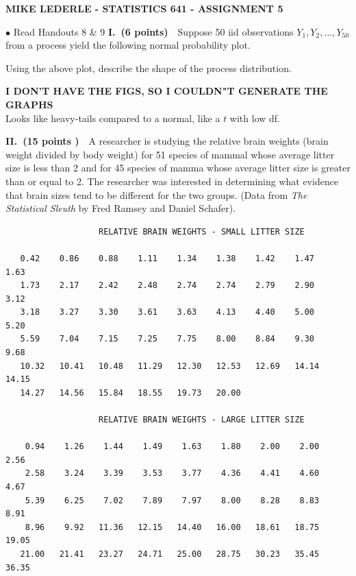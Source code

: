 \documentclass{article}\usepackage{graphicx, color}
\def\vvn{\vskip0mm\noindent}
\def\vnn{\vskip0mm\noindent}
\begin{document}
\begin{center}
{\bf MIKE LEDERLE - STATISTICS 641 - ASSIGNMENT 5}
\end{center}
\vskip0mm\noindent
\normalsize
\vnn\vnn
$\bullet$ Read Handouts 8 \& 9
\vnn\vnn
{\bf I.\ (6 points)}\ \   Suppose 50  iid
  observations $Y_1,Y_2,\ldots,Y_{50}$ from a process yield the following normal
  probability plot.


Using the above plot, describe the shape of the process distribution.
\vskip3mm
\vvn
\begin{shaded}
{\bf I DON'T HAVE THE FIGS, SO I COULDN"T GENERATE THE GRAPHS}\\[5pt]
Looks like heavy-tails compared to a normal, like a $t$ with low df.
\end{shaded}
{\bf II.\ (15 points )}\ \  A researcher is studying the relative brain weights (brain weight divided by body weight) for 51 species of mammal whose average litter size is less than 2 and for 45 species of mamma whose average litter size is greater than or equal to 2. The researcher was interested in determining what evidence that brain sizes tend to be different for
    the two groups. (Data from {\it The Statistical Sleuth} by Fred Ramsey and Daniel Schafer).
  \vvn
  \footnotesize
  \begin{verbatim}
                   RELATIVE BRAIN WEIGHTS - SMALL LITTER SIZE

   0.42    0.86    0.88    1.11    1.34    1.38    1.42    1.47    1.63
   1.73    2.17    2.42    2.48    2.74    2.74    2.79    2.90    3.12
   3.18    3.27    3.30    3.61    3.63    4.13    4.40    5.00    5.20
   5.59    7.04    7.15    7.25    7.75    8.00    8.84    9.30    9.68
   10.32   10.41   10.48   11.29   12.30   12.53   12.69   14.14   14.15
   14.27   14.56   15.84   18.55   19.73   20.00

                   RELATIVE BRAIN WEIGHTS - LARGE LITTER SIZE

    0.94    1.26    1.44    1.49    1.63    1.80    2.00    2.00    2.56
    2.58    3.24    3.39    3.53    3.77    4.36    4.41    4.60    4.67
    5.39    6.25    7.02    7.89    7.97    8.00    8.28    8.83    8.91
    8.96    9.92   11.36   12.15   14.40   16.00   18.61   18.75   19.05
   21.00   21.41   23.27   24.71   25.00   28.75   30.23   35.45   36.35
  \end{verbatim}
\end{document}
